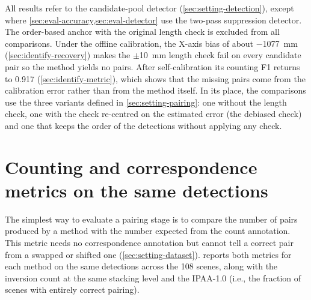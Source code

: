 \documentclass[a4paper, 12pt, twoside]{book}
\begin{document}
All results refer to the candidate-pool detector (\cref{sec:setting-detection}), except where \cref{sec:eval-accuracy,sec:eval-detector} use the two-pass suppression detector. The order-based anchor with the original length check is excluded from all comparisons. Under the offline calibration, the X-axis bias of about $-$1077~mm (\cref{sec:identify-recovery}) makes the $\pm$10~mm length check fail on every candidate pair so the method yields no pairs. After self-calibration its counting F1 returns to 0.917 (\cref{sec:identify-metric}), which shows that the missing pairs come from the calibration error rather than from the method itself. In its place, the comparisons use the three variants defined in \cref{sec:setting-pairing}: one without the length check, one with the check re-centred on the estimated error (the debiased check) and one that keeps the order of the detections without applying any check.

\section{Counting and correspondence metrics on the same detections}
\label{sec:eval-counting}

The simplest way to evaluate a pairing stage is to compare the number of pairs produced by a method with the number expected from the count annotation. This metric needs no correspondence annotation but cannot tell a correct pair from a swapped or shifted one (\cref{sec:setting-dataset}).  reports both metrics for each method on the same detections across the 108 scenes, along with the inversion count at the same stacking level and the IPAA-1.0 (i.e., the fraction of scenes with entirely correct pairing).
\end{document}
